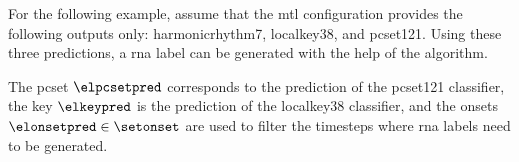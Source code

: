 
For the following example, assume that the \gls{mtl}
configuration provides the following outputs only:
\gls{harmonicrhythm7}, \gls{localkey38}, and \gls{pcset121}.
Using these three predictions, a \gls{rna} label can be
generated with the help of the \algorithmrn{} algorithm.

The \gls{pcset} $\elpcsetpred$ corresponds to the prediction
of the \gls{pcset121} classifier, the key $\elkeypred$ is
the prediction of the \gls{localkey38 classifier}, and the
onsets $\elonsetpred \in \setonset$ are used to filter the
timesteps where \gls{rna} labels need to be generated.
